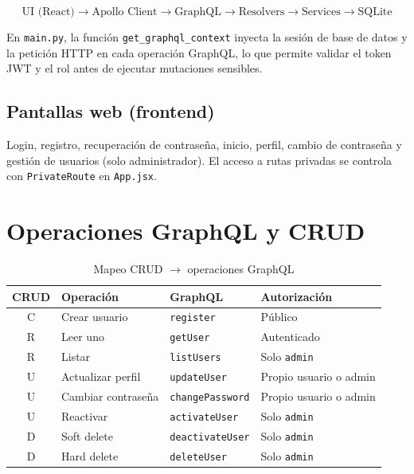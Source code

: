 \documentclass[11pt,a4paper]{article}
\begin{document}
\[
  \text{UI (React)} \rightarrow \text{Apollo Client} \rightarrow \text{GraphQL} \rightarrow \text{Resolvers} \rightarrow \text{Services} \rightarrow \text{SQLite}
\]

En \texttt{main.py}, la función \texttt{get\_graphql\_context} inyecta la sesión de base de datos y la petición HTTP en cada operación GraphQL, lo que permite validar el token JWT y el rol antes de ejecutar mutaciones sensibles.

\subsection{Pantallas web (frontend)}
Login, registro, recuperación de contraseña, inicio, perfil, cambio de contraseña y gestión de usuarios (solo administrador). El acceso a rutas privadas se controla con \texttt{PrivateRoute} en \texttt{App.jsx}.

\section{Operaciones GraphQL y CRUD}

\begin{table}[h]
  \centering
  \caption{Mapeo CRUD $\rightarrow$ operaciones GraphQL}
  \small
  \begin{tabular}{@{}clll@{}}
    \toprule
    \textbf{CRUD} & \textbf{Operación} & \textbf{GraphQL} & \textbf{Autorización} \\
    \midrule
    C & Crear usuario & \texttt{register} & Público \\
    R & Leer uno & \texttt{getUser} & Autenticado \\
    R & Listar & \texttt{listUsers} & Solo \texttt{admin} \\
    U & Actualizar perfil & \texttt{updateUser} & Propio usuario o admin \\
    U & Cambiar contraseña & \texttt{changePassword} & Propio usuario o admin \\
    U & Reactivar & \texttt{activateUser} & Solo \texttt{admin} \\
    D & Soft delete & \texttt{deactivateUser} & Solo \texttt{admin} \\
    D & Hard delete & \texttt{deleteUser} & Solo \texttt{admin} \\
    \bottomrule
  \end{tabular}
\end{table}
\end{document}
